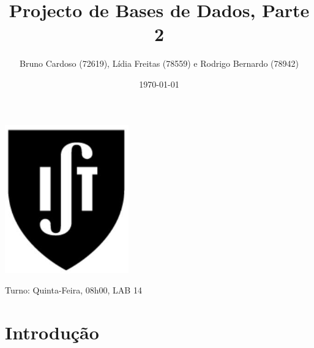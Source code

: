 \documentclass[11pt,a4paper]{article}
\title{\textbf{Projecto de Bases de Dados, Parte 2}}
\author{Bruno Cardoso (72619), Lídia Freitas (78559) e Rodrigo Bernardo (78942)}
\affil{Instituto Superior Técnico}
\begin{document}
\date {\today}

\maketitle
\thispagestyle{empty} %
\centerline{\includegraphics[width=0.4\textwidth]{ist-simbolo.jpg}}

\begin{description}[noitemsep]
	\item {}
	\item Turno: Quinta-Feira, 08h00, LAB 14
\end{description}

\newpage

\tableofcontents
\newpage

\section{Introdução}
\newpage
\end{document}

